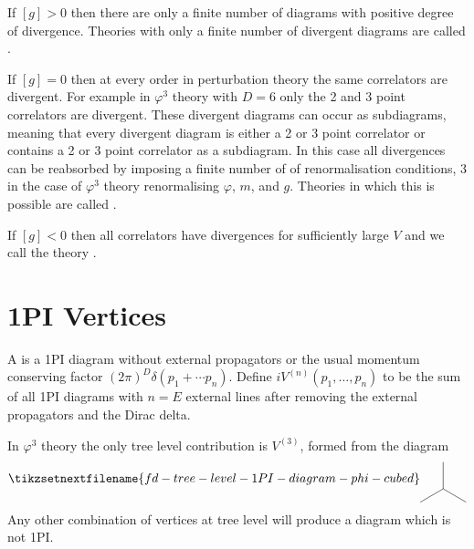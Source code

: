 \documentclass[fleqn]{NotesClass}
\begin{document}
    If \([g] > 0\) then there are only a finite number of diagrams with positive degree of divergence.
    Theories with only a finite number of divergent diagrams are called .
    
    If \([g] = 0\) then at every order in perturbation theory the same correlators are divergent.
    For example in \(\varphi^3\) theory with \(D = 6\) only the 2 and 3 point correlators are divergent.
    These divergent diagrams can occur as subdiagrams, meaning that every divergent diagram is either a 2 or 3 point correlator or contains a 2 or 3 point correlator as a subdiagram.
    In this case all divergences can be reabsorbed by imposing a finite number of of renormalisation conditions, 3 in the case of \(\varphi^3\) theory renormalising \(\varphi\), \(m\), and \(g\).
    Theories in which this is possible are called .
    
    If \([g] < 0\) then all correlators have divergences for sufficiently large \(V\) and we call the theory .
    
    \section{1PI Vertices}
    A  is a 1PI diagram without external propagators or the usual momentum conserving factor \((2\pi)^D\delta(p_1 + \dotsb p_n)\).
    Define \(iV^{(n)}(p_1, \dotsc, p_n)\) to be the sum of all 1PI diagrams with \(n = E\) external lines after removing the external propagators and the Dirac delta.
    
    In \(\varphi^3\) theory the only tree level contribution is \(V^{(3)}\), formed from the diagram
    \begin{equation}
        \tikzsetnextfilename{fd-tree-level-1PI-diagram-phi-cubed}
        \begin{tikzpicture}[
            baseline=(current bounding box)
            ]
            \draw (0, 0) -- (0, 0.75);
            \draw (0, 0) -- (-30:0.75);
            \draw (0, 0) -- (210:0.75);
        \end{tikzpicture}
    \end{equation}
    Any other combination of vertices at tree level will produce a diagram which is not 1PI.
    
\end{document}
